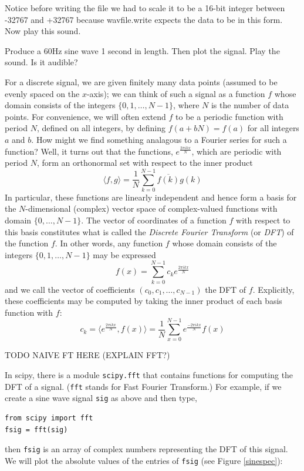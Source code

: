 Notice before writing the file we had to scale it to be a 16-bit integer between -32767 and +32767 because wavfile.write expects the data to be in this form.  Now play this sound. 

\begin{problem}
Produce a 60Hz sine wave 1 second in length. Then plot the signal. Play the sound. Is it audible?
\end{problem}


For a discrete signal, we are given finitely many data points (assumed to be evenly spaced on the $x$-axis); we can think of such a signal as a function $f$ whose domain consists of the integers $\{0,1,\dots,N-1\}$, where $N$ is the number of data points. For convenience, we will often extend $f$ to be a periodic function with period $N$, defined on all integers, by defining $f(a+bN)=f(a)$ for all integers $a$ and $b$. How might we find something analagous to a Fourier series for such a function? Well, it turns out that the functions, $e^{\frac{2\pi ikx}N}$, which are periodic with period $N$, form an orthonormal set with respect to the inner product
$$\langle f,g\rangle = \frac1N\sum_{k=0}^{N-1}\overline{f(k)}g(k)$$
In particular, these functions are linearly independent and hence form a basis for the $N$-dimensional (complex) vector space of complex-valued functions with domain $\{0,\dots,N-1\}$. The vector of coordinates of a function $f$ with respect to this basis constitutes what is called the \emph{Discrete Fourier Transform} (or \emph{DFT}) of the function $f$. In other words, any function $f$ whose domain consists of the integers $\{0,1,\dots,N-1\}$ may be expressed
$$f(x)=\sum_{k=0}^{N-1}c_ke^{\frac{2\pi ikx}N}$$
and we call the vector of coefficients $(c_0,c_1,\dots,c_{N-1})$ the DFT of $f$. Explicitly, these coefficients may be computed by taking the inner product of each basis function with $f$:
$$c_k=\langle e^{\frac{2\pi ikx}N}, f(x)\rangle=\frac1N\sum_{x=0}^{N-1}e^{\frac{-2\pi ikx}N}f(x)$$

TODO NAIVE FT HERE (EXPLAIN FFT?)

In scipy, there is a module \texttt{scipy.fft} that contains functions for computing the DFT of a signal. (\texttt{fft} stands for Fast Fourier Transform.) For example, if we create a sine wave signal \texttt{sig} as above and then type,
\begin{lstlisting}
from scipy import fft
fsig = fft(sig)
\end{lstlisting}
then \texttt{fsig} is an array of complex numbers representing the DFT of this signal. We will plot the absolute values of the entries of \texttt{fsig} (see Figure \ref{sinespec}):

